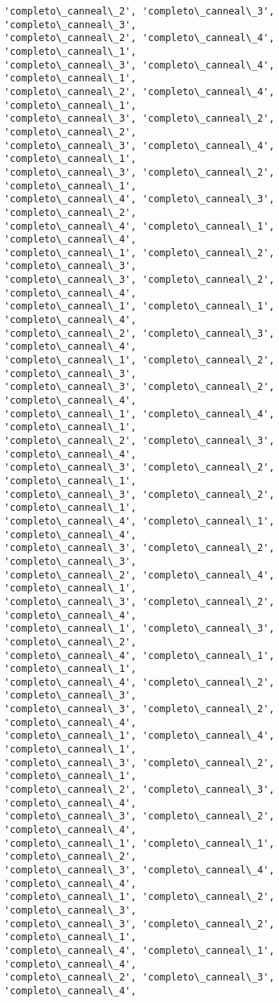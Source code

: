\documentclass[11pt]{article}
\begin{document}
\begin{Verbatim}[commandchars=\\\{\}]
'completo\_canneal\_2', 'completo\_canneal\_3', 'completo\_canneal\_3',
'completo\_canneal\_2', 'completo\_canneal\_4', 'completo\_canneal\_1',
'completo\_canneal\_3', 'completo\_canneal\_4', 'completo\_canneal\_1',
'completo\_canneal\_2', 'completo\_canneal\_4', 'completo\_canneal\_1',
'completo\_canneal\_3', 'completo\_canneal\_2', 'completo\_canneal\_2',
'completo\_canneal\_3', 'completo\_canneal\_4', 'completo\_canneal\_1',
'completo\_canneal\_3', 'completo\_canneal\_2', 'completo\_canneal\_1',
'completo\_canneal\_4', 'completo\_canneal\_3', 'completo\_canneal\_2',
'completo\_canneal\_4', 'completo\_canneal\_1', 'completo\_canneal\_4',
'completo\_canneal\_1', 'completo\_canneal\_2', 'completo\_canneal\_3',
'completo\_canneal\_3', 'completo\_canneal\_2', 'completo\_canneal\_4',
'completo\_canneal\_1', 'completo\_canneal\_1', 'completo\_canneal\_4',
'completo\_canneal\_2', 'completo\_canneal\_3', 'completo\_canneal\_4',
'completo\_canneal\_1', 'completo\_canneal\_2', 'completo\_canneal\_3',
'completo\_canneal\_3', 'completo\_canneal\_2', 'completo\_canneal\_4',
'completo\_canneal\_1', 'completo\_canneal\_4', 'completo\_canneal\_1',
'completo\_canneal\_2', 'completo\_canneal\_3', 'completo\_canneal\_4',
'completo\_canneal\_3', 'completo\_canneal\_2', 'completo\_canneal\_1',
'completo\_canneal\_3', 'completo\_canneal\_2', 'completo\_canneal\_1',
'completo\_canneal\_4', 'completo\_canneal\_1', 'completo\_canneal\_4',
'completo\_canneal\_3', 'completo\_canneal\_2', 'completo\_canneal\_3',
'completo\_canneal\_2', 'completo\_canneal\_4', 'completo\_canneal\_1',
'completo\_canneal\_3', 'completo\_canneal\_2', 'completo\_canneal\_4',
'completo\_canneal\_1', 'completo\_canneal\_3', 'completo\_canneal\_2',
'completo\_canneal\_4', 'completo\_canneal\_1', 'completo\_canneal\_1',
'completo\_canneal\_4', 'completo\_canneal\_2', 'completo\_canneal\_3',
'completo\_canneal\_3', 'completo\_canneal\_2', 'completo\_canneal\_4',
'completo\_canneal\_1', 'completo\_canneal\_4', 'completo\_canneal\_1',
'completo\_canneal\_3', 'completo\_canneal\_2', 'completo\_canneal\_1',
'completo\_canneal\_2', 'completo\_canneal\_3', 'completo\_canneal\_4',
'completo\_canneal\_3', 'completo\_canneal\_2', 'completo\_canneal\_4',
'completo\_canneal\_1', 'completo\_canneal\_1', 'completo\_canneal\_2',
'completo\_canneal\_3', 'completo\_canneal\_4', 'completo\_canneal\_4',
'completo\_canneal\_1', 'completo\_canneal\_2', 'completo\_canneal\_3',
'completo\_canneal\_3', 'completo\_canneal\_2', 'completo\_canneal\_1',
'completo\_canneal\_4', 'completo\_canneal\_1', 'completo\_canneal\_4',
'completo\_canneal\_2', 'completo\_canneal\_3', 'completo\_canneal\_4',

\end{Verbatim}
\end{document}

